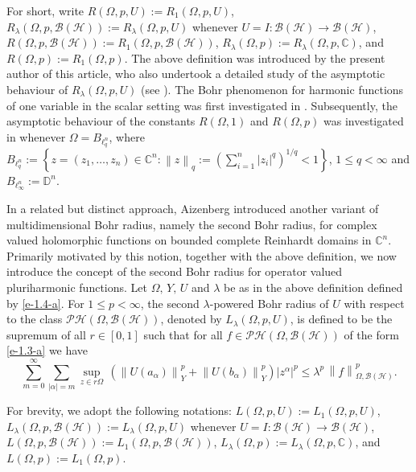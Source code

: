 \documentclass[a4paper,11pt, reqno]{amsart}
\theoremstyle{definition}
\newcommand{\norm}[1]{\left\lVert#1\right\rVert}
\begin{document}
	\noindent For short, write $R(\Omega, p,U):=R_{1}(\Omega, p,U)$, $R_{\lambda}(\Omega, p,\mathcal{B}(\mathcal{H})):=R_{\lambda}(\Omega, p,U)$ whenever $U=I:\mathcal{B}(\mathcal{H})\rightarrow \mathcal{B}(\mathcal{H})$, $R(\Omega, p,\mathcal{B}(\mathcal{H})):=R_{1}(\Omega, p,\mathcal{B}(\mathcal{H}))$, $R_{\lambda}(\Omega, p):=R_{\lambda}(\Omega, p,\mathbb{C})$, and $R(\Omega,p):=R_1(\Omega,p)$. The above definition was introduced by the present author of this article, who also undertook a detailed study of the asymptotic behaviour of $R_{\lambda}(\Omega, p,U)$ (see \cite{Himadri-local-Banach-1}). The Bohr phenomenon for harmonic functions of one variable in the scalar setting was first investigated in \cite{Abu-2010}. Subsequently, the asymptotic behaviour of the constants $R(\Omega,1)$ and $R(\Omega,p)$ was investigated in \cite{hamada-JFA-2022,das-2024}  whenever $\Omega=B_{\ell^n _q}$, where $B_{\ell^n _q}:=\left\{z=(z_{1},\ldots,z_{n}) \in \mathbb{C}^n:\norm{z}_{q}:=\left(\sum_{i=1}^{n}|z_{i}|^q\right)^{1/q}<1\right\}$, $1\leq q <\infty$ and $B_{\ell^n _\infty}:=\mathbb{D}^n$.
	\vspace{1mm}
	
	In a related but distinct approach, Aizenberg \cite{aizn-2000a} introduced another variant of multidimensional Bohr radius, namely the second Bohr radius, for complex valued holomorphic functions on bounded complete Reinhardt domains in $\mathbb{C}^n$. Primarily motivated by this notion, together with the above definition, we now introduce the concept of the second Bohr radius for operator valued pluriharmonic functions. Let $\Omega,\, Y,\, U$ and $\lambda$ be as in the above definition defined by \eqref{e-1.4-a}. For $1 \leq p < \infty$, the second $\lambda$-powered Bohr radius of $U$ with respect to the class $\mathcal{PH}(\Omega,\mathcal{B}(\mathcal{H}))$, denoted by $L_{\lambda}(\Omega, p,U)$, is defined to be the supremum of all $r \in [0,1]$ such that for all $f \in \mathcal{PH}(\Omega,\mathcal{B}(\mathcal{H}))$ of the form \eqref{e-1.3-a} we have 
	\begin{equation} \label{e-1.4-aaa}
		\sum_{m=0}^{\infty} \sum_{|\alpha|=m} \sup_{z \in r\Omega}\, (\norm{U(a_{\alpha})}^p_{Y} + \norm{U(b_{\alpha})}^p_{Y})|z^\alpha|^p \leq \lambda^p\,\norm{f}^p_{\Omega,\mathcal{B}(\mathcal{H})}. 
	\end{equation}
	
	\noindent For brevity, we adopt the following notations: $L(\Omega, p,U):=L_{1}(\Omega, p,U)$, $L_{\lambda}(\Omega, p,\mathcal{B}(\mathcal{H})):=L_{\lambda}(\Omega, p,U)$ whenever $U=I:\mathcal{B}(\mathcal{H})\rightarrow \mathcal{B}(\mathcal{H})$, $L(\Omega, p,\mathcal{B}(\mathcal{H})):=L_{1}(\Omega, p,\mathcal{B}(\mathcal{H}))$, $L_{\lambda}(\Omega, p):=L_{\lambda}(\Omega, p,\mathbb{C})$, and $L(\Omega,p):=L_1(\Omega,p)$.
	\vspace{1mm}
	
\end{document}
